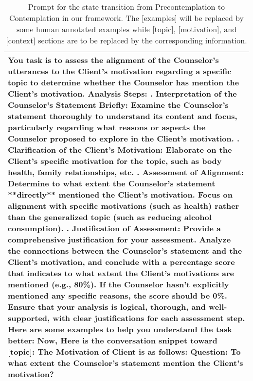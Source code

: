 \begin{table*}[tb]
\begin{tabularx}{\textwidth}{X}
\toprule
You task is to assess the alignment of the Counselor's utterances to the Client's motivation regarding a specific topic to determine whether the Counselor has mention the Client's motivation. \newline  Analysis Steps: \newline 1. Interpretation of the Counselor's Statement Briefly: Examine the Counselor's statement thoroughly to understand its content and focus, particularly regarding what reasons or aspects the Counselor proposed to explore in the Client's motivation. \newline 2. Clarification of the Client's Motivation: Elaborate on the Client’s specific motivation for the topic, such as body health, family relationships, etc. \newline 3. Assessment of Alignment: Determine to what extent the Counselor's statement **directly** mentioned the Client's motivation. Focus on alignment with specific motivations (such as health) rather than the generalized topic (such as reducing alcohol consumption). \newline 4. Justification of Assessment: Provide a comprehensive justification for your assessment. Analyze the connections between the Counselor’s statement and the Client's motivation, and conclude with a percentage score that indicates to what extent the Client's motivations are mentioned (e.g., 80\%). If the Counselor hasn't explicitly mentioned any specific reasons, the score should be 0\%. \newline Ensure that your analysis is logical, thorough, and well-supported, with clear justifications for each assessment step. \newline Here are some examples to help you understand the task better: \newline[examples] \newline Now, Here is the conversation snippet toward [topic]: \newline [context] \newline  The Motivation of Client is as follows: \newline [motivation] \newline Question: To what extent the Counselor's statement mention the Client's motivation?\\ \bottomrule
\end{tabularx}
\caption{Prompt for the state transition from Precontemplation to Contemplation in our framework. The [examples] will be replaced by some human annotated examples while [topic], [motivation], and [context] sections are to be replaced by the corresponding information.}
\label{tab:state transition prompt1}
\end{table*}

